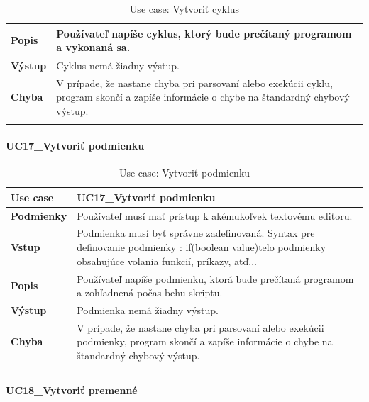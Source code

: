 {\begin{center}
\begin{longtable}{|p{2.5cm}|p{12.2cm}|}
			\textbf{Popis} & Používateľ napíše cyklus, ktorý bude prečítaný programom a vykonaná sa.\\ 
			\hline
			\textbf{Výstup} & Cyklus nemá žiadny výstup.\\
			\hline
			\textbf{Chyba} & V prípade, že nastane chyba pri parsovaní alebo exekúcii cyklu, program skončí a zapíše informácie o chybe na štandardný chybový výstup.\\
			\hline
		\caption{Use case: Vytvoriť cyklus}
		\label{table:1}
		
	\end{longtable}
\end{center}
\paragraph{UC17\_Vytvoriť podmienku}
\begin{center}
	\begin{longtable}{|p{2.5cm}|p{12.2cm}|}
		
			\hline
			\textbf{Use case} & UC17\_Vytvoriť podmienku \\ 
			\hline
			\textbf{Podmienky} & Používateľ musí mať prístup k akémukoľvek textovému editoru.  \\ 
			\hline
			\textbf{Vstup} & Podmienka musí byť správne zadefinovaná. 
			Syntax pre definovanie podmienky : 
			\newline
			if(boolean value){telo podmienky obsahujúce volania funkcií, príkazy, atď..}. \\
			\hline
			\textbf{Popis} & Používateľ napíše podmienku, ktorá bude prečítaná programom a zohľadnená počas behu skriptu.\\ 
			\hline
			\textbf{Výstup} & Podmienka nemá žiadny výstup.\\
			\hline
			\textbf{Chyba} & V prípade, že nastane chyba pri parsovaní alebo exekúcii podmienky, program skončí a zapíše informácie o chybe na štandardný chybový výstup.\\
			\hline
		\caption{Use case: Vytvoriť podmienku}
		\label{table:1}
		
	\end{longtable}
\end{center}
\newpage
\paragraph{UC18\_Vytvoriť premenné}
\begin{center}
	\begin{longtable}{|p{2.5cm}|p{12.2cm}|}
		

\end{longtable}
\end{center}}
